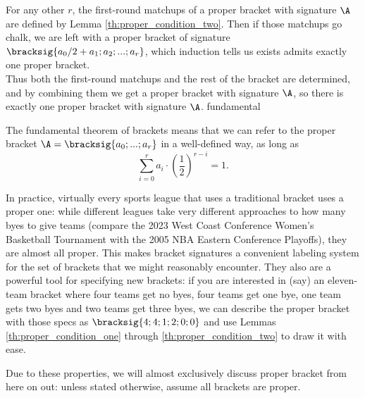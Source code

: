 {{        For any other $r$, the first-round matchups of a proper bracket with signature $\A$ are defined by Lemma \ref{th:proper_condition_two}. Then if those matchups go chalk, we are left with a proper bracket of signature $\bracksig{a_0/2 + a_1; a_2; ...; a_r}$, which induction tells us exists admits exactly one proper bracket.\\

        Thus both the first-round matchups and the rest of the bracket are determined, and by combining them we get a proper bracket with signature $\A$, so there is exactly one proper bracket with signature $\A$.
    }{fundamental}{\fried}

    The fundamental theorem of brackets means that we can refer to the proper bracket $\A = \bracksig{a_0; ...; a_r}$ in a well-defined way, as long as $$\sum_{i=0}^r a_i \cdot \left(\frac{1}{2}\right)^{r - i} = 1.$$

    In practice, virtually every sports league that uses a traditional bracket uses a proper one: while different leagues take very different approaches to how many byes to give teams (compare the 2023 West Coast Conference Women's Basketball Tournament with the 2005 NBA Eastern Conference Playoffs), they are almost all proper. This makes bracket signatures a convenient labeling system for the set of brackets that we might reasonably encounter. They also are a powerful tool for specifying new brackets: if you are interested in (say) an eleven-team bracket where four teams get no byes, four teams get one bye, one team gets two byes and two teams get three byes, we can describe the proper bracket with those specs as $\bracksig{4; 4; 1; 2; 0; 0}$ and use Lemmas \ref{th:proper_condition_one} through \ref{th:proper_condition_two} to draw it with ease.


    Due to these properties, we will almost exclusively discuss proper bracket from here on out: unless stated otherwise, assume all brackets are proper.
}